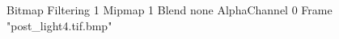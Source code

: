 {Bitmap
	{Filtering 1}
	{Mipmap 1}
	{Blend none}
	{AlphaChannel 0}
	{Frame "post_light4.tif.bmp"}
}
